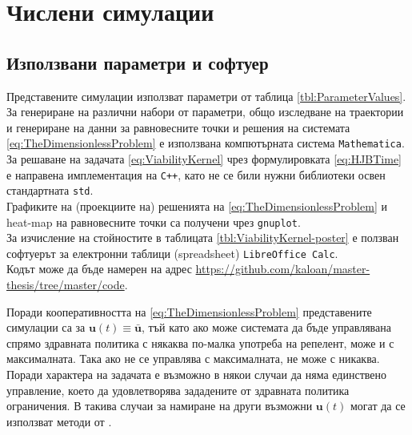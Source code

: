 \section{\hspace{1em} Числени симулации}

\subsection{Използвани параметри и софтуер}
Представените симулации използват параметри от таблица \ref{tbl:ParameterValues}. \\
За генериране на различни набори от параметри, общо изследване на траектории и генериране на данни за равновесните точки и решения на системата \eqref{eq:TheDimensionlessProblem} е използвана компютърната система \texttt{Mathematica}. \\
За решаване на задачата \eqref{eq:ViabilityKernel} чрез формулировката \eqref{eq:HJBTime} е направена имплементация на \texttt{C++}, като не се били нужни библиотеки освен стандартната \texttt{std}. \\
Графиките на (проекциите на) решенията на \eqref{eq:TheDimensionlessProblem} и heat-map на равновесните точки са получени чрез \texttt{gnuplot}. \\
За изчисление на стойностите в таблицата \ref{tbl:ViabilityKernel-poster} е ползван софтуерът за електронни таблици (spreadsheet) \texttt{LibreOffice Calc}. \\
Кодът може да бъде намерен на адрес \url{https://github.com/kaloan/master-thesis/tree/master/code}.

\begin{remark}
  Поради кооперативността на \eqref{eq:TheDimensionlessProblem} представените симулации са за $\mathbf{u}(t) \equiv \bar{\mathbf{u}}$, тъй като ако може системата да бъде управлявана спрямо здравната политика с някаква по-малка употреба на репелент, може и с максималната.
  Така ако не се управлява с максималната, не може с никаква.
  Поради характера на задачата е възможно в някои случаи да няма единствено управление, което да удовлетворява зададените от здравната политика ограничения.
  В такива случаи за намиране на други възможни $\mathbf{u}(t)$ могат да се използват методи от \cite{Assellaou2016, Assellaou2018}.
\end{remark}


